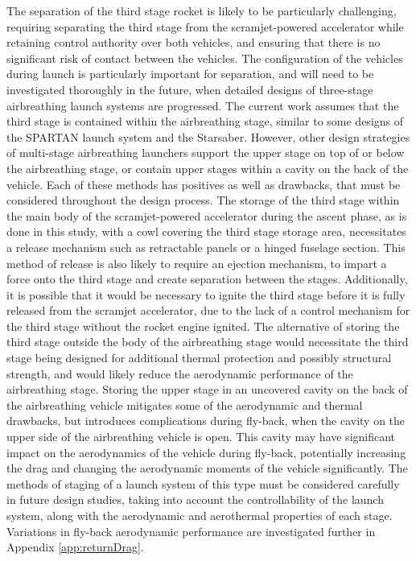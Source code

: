 The separation of the third stage rocket is likely to be particularly challenging, requiring separating the third stage from the scramjet-powered accelerator while retaining control authority over both vehicles, and ensuring that there is no significant risk of contact between the vehicles. The configuration of the vehicles during launch is particularly important for separation, and will need to be investigated thoroughly in the future, when detailed designs of three-stage airbreathing launch systems are progressed. The current work assumes that the third stage is contained within the airbreathing stage, similar to some designs of the SPARTAN launch system\cite{Jazra2013} and the Starsaber\cite{Germain2001}. However, other design strategies of multi-stage airbreathing launchers support the upper stage on top of\cite{Gong2014,Tsuchiya2005} or below\cite{Takahashi1997} the airbreathing stage, or contain upper stages within a cavity on the back of the vehicle\cite{Preller2017b,Mehta2001,Wilhite1991}. Each of these methods has positives as well as drawbacks, that must be considered throughout the design process.
The storage of the third stage within the main body of the scramjet-powered accelerator during the ascent phase, as is done in this study, with a cowl covering the third stage storage area, necessitates a release mechanism such as retractable panels or a hinged fuselage section. This method of release is also likely to require an ejection mechanism, to impart a force onto the third stage and create separation between the stages. Additionally, it is possible that it would be necessary to ignite the third stage before it is fully released from the scramjet accelerator, due to the lack of a control mechanism for the third stage without the rocket engine ignited. 
The alternative of storing the third stage outside the body of the airbreathing stage would necessitate the third stage being designed for additional thermal protection and possibly structural strength, and would likely reduce the aerodynamic performance of the airbreathing stage. Storing the upper stage in an uncovered cavity on the back of the airbreathing vehicle mitigates some of the aerodynamic and thermal drawbacks, but introduces complications during fly-back, when the cavity on the upper side of the airbreathing vehicle is open. This cavity may have significant impact on the aerodynamics of the vehicle during fly-back, potentially increasing the drag and changing the aerodynamic moments of the vehicle significantly. 
The methods of staging of a launch system of this type must be considered carefully in future design studies, taking into account the controllability of the launch system, along with the aerodynamic and aerothermal properties of each stage. Variations in fly-back aerodynamic performance are investigated further in Appendix \ref{app:returnDrag}. 


